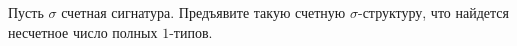 Пусть $\sigma$ счетная сигнатура. Предъявите такую счетную $\sigma$-структуру, что найдется несчетное
число полных $1$-типов.
